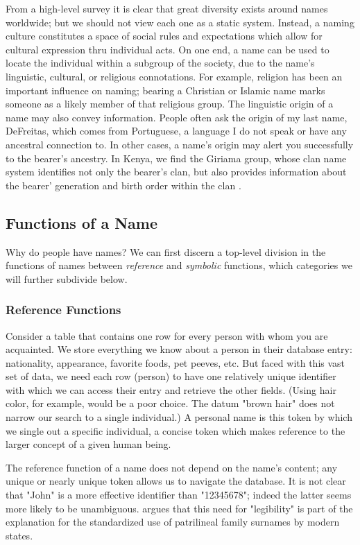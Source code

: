 From a high-level survey it is clear that great diversity exists around names
worldwide; but we should not view each one as a static system. Instead, a naming
culture constitutes a space of social rules and expectations which allow for
cultural expression thru individual acts. On one end, a name can be used to
locate the individual within a subgroup of the society, due to the name's
linguistic, cultural, or religious connotations. For example, religion has been
an important influence on naming; bearing a Christian or Islamic name marks
someone as a likely member of that religious group. The linguistic origin of a
name may also convey information. People often ask the origin of my last name,
DeFreitas, which comes from Portuguese, a language I do not speak or have any
ancestral connection to. In other cases, a name's origin may alert you
successfully to the bearer's ancestry. In Kenya, we find the Giriama group,
whose clan name system identifies not only the bearer's clan, but also provides
information about the bearer' generation and birth order within the clan
\textcite{parkin89}.

\subsection{Functions of a Name}

Why do people have names? We can first discern a top-level division in the
functions of names between \textit{reference} and \textit{symbolic} functions,
which categories we will further subdivide below.

\subsubsection{Reference Functions}

Consider a table that contains one row for every person with whom you are
acquainted. We store everything we know about a person in their database entry:
nationality, appearance, favorite foods, pet peeves, etc. But faced with this
vast set of data, we need each row (person) to have one relatively unique
identifier with which we can access their entry and retrieve the other fields.
(Using hair color, for example, would be a poor choice. The datum "brown hair"
does not narrow our search to a single individual.) A personal name is this
token by which we single out a specific individual, a concise token which makes
reference to the larger concept of a given human being.

The reference function of a name does not depend on the name's content; any
unique or nearly unique token allows us to navigate the database. It is not
clear that "John" is a more effective identifier than "12345678"; indeed the
latter seems more likely to be unambiguous. \textcite{scott02} argues that this
need for "legibility" is part of the explanation for the standardized use of
patrilineal family surnames by modern states.

